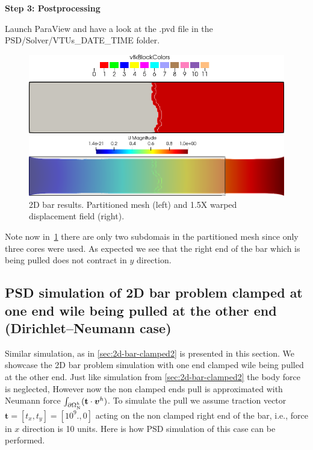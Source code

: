 \textbf{Step 3: Postprocessing}

Launch ParaView and have a look at the  {\ttfamily .pvd} file in the  {\ttfamily PSD/Solver/VTUs\_DATE\_TIME} folder. 

\begin{figure}[htbp]
    \centering
    \begin{minipage}[t][2cm][t]{0.39\textwidth}
    \includegraphics[align=t,width=1\textwidth]{./Images/2d-bar-clamped-pulled-partioned.png}
    \end{minipage}\hspace{.1\textwidth}
    \begin{minipage}[t][2cm][t]{0.5\textwidth}
    \includegraphics[align=t,width=1\textwidth]{./Images/2d-bar-clamped-pulled.png}
    \end{minipage}
    \caption{2D bar results. Partitioned mesh (left) and 1.5X warped displacement field (right).}
    \label{fig:2part}
\end{figure}

Note now in~\cref{fig:2part} there are only two subdomais in the partitioned mesh since only three cores were used. As expected we see that the right end of the bar which is being pulled does not contract in $y$ direction.
\pagebreak


\subsection{PSD simulation of 2D bar problem clamped at one end wile being pulled at the other end (Dirichlet--Neumann case)\label{sec:2d-bar-clamped3}}


Similar simulation, as in \cref{sec:2d-bar-clamped2} is presented in this section. We showcase the 2D bar problem simulation with one end clamped wile being pulled at the other end. Just like simulation from \cref{sec:2d-bar-clamped2} the body force is neglected, However now  the non clamped ends pull is approximated with Neumann force $\int_{\partial\Omega^h_{\text N}}(\mathbf t\cdot \boldsymbol v^h)$. To simulate the pull we assume traction vector $\mathbf t=[t_x,t_y]=[10^9.,0]$ acting on the non clamped right end of the bar, i.e., force in $x$ direction is 10 units. Here is how PSD simulation of this case can be performed.


